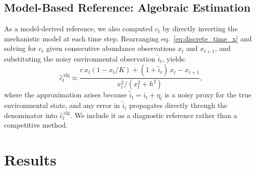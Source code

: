 \documentclass[openacc]{rsproca_new}%
\begin{document}
\subsection{Model-Based Reference: Algebraic Estimation}
As a model-derived reference, we also computed $c_t$ by directly inverting the mechanistic model at each time step. Rearranging eq.~\eqref{eq:discrete_time_x} and solving for $c_t$ given consecutive abundance observations $x_t$ and $x_{t+1}$, and substituting the noisy environmental observation $\tilde{i}_t$, yields:
%
\begin{equation}
    \hat{c}_t^{\,\mathrm{alg}}
        \approx \frac{r\,x_t\!\left(1 - x_t/K\right)
                + (1 + \tilde{i}_t)\,x_t - x_{t+1}}
               {x_t^2/(x_t^2 + h^2)},
    \label{eq:c_alg}
\end{equation}
%
where the approximation arises because $\tilde{i}_t = i_t + \eta_t$ is a noisy proxy for the true environmental state, and any error in $\tilde{i}_t$ propagates directly through the denominator into $\hat{c}_t^{\,\mathrm{alg}}$. We include it as a diagnostic reference rather than a competitive
method.
% 
% 
\section{Results}\label{sec:results}
\end{document}
